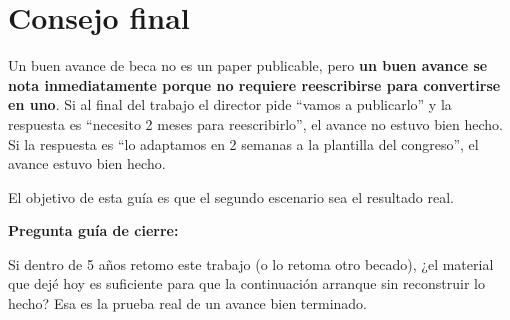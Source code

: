 \documentclass[11pt,a4paper]{article}
\begin{document}
\hrulefill

\section{Consejo final}

Un buen avance de beca no es un paper publicable, pero \textbf{un buen avance se nota inmediatamente porque no requiere reescribirse para convertirse en uno}. Si al final del trabajo el director pide ``vamos a publicarlo'' y la respuesta es ``necesito 2 meses para reescribirlo'', el avance no estuvo bien hecho. Si la respuesta es ``lo adaptamos en 2 semanas a la plantilla del congreso'', el avance estuvo bien hecho.

El objetivo de esta guía es que el segundo escenario sea el resultado real.

\begin{guia}
\textbf{Pregunta guía de cierre:}

Si dentro de 5 años retomo este trabajo (o lo retoma otro becado), ¿el material que dejé hoy es suficiente para que la continuación arranque sin reconstruir lo hecho? Esa es la prueba real de un avance bien terminado.
\end{guia}
\end{document}
